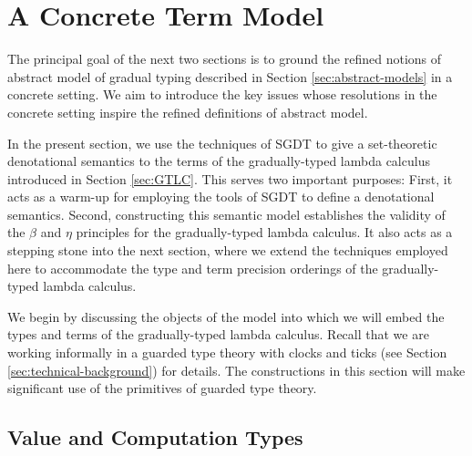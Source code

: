 \section{A Concrete Term Model}\label{sec:concrete-term-model}

The principal goal of the next two sections is to ground the refined notions of
abstract model of gradual typing described in Section \ref{sec:abstract-models}
in a concrete setting. We aim to introduce the key issues whose resolutions in
the concrete setting inspire the refined definitions of abstract model.

In the present section, we use the techniques of SGDT to give a set-theoretic
denotational semantics to the terms of the gradually-typed lambda calculus
introduced in Section \ref{sec:GTLC}. This serves two important purposes: First,
it acts as a warm-up for employing the tools of SGDT to define a denotational
semantics. Second, constructing this semantic model establishes the validity of
the $\beta$ and $\eta$ principles for the gradually-typed lambda calculus. It
also acts as a stepping stone into the next section, where we extend the
techniques employed here to accommodate the type and term precision orderings of
the gradually-typed lambda calculus.
%



We begin by discussing the objects of the model into which we will embed the
types and terms of the gradually-typed lambda calculus. Recall that we are
working informally in a guarded type theory with clocks and ticks (see Section
\ref{sec:technical-background}) for details. The constructions in this section
will make significant use of the primitives of guarded type theory.

\subsection{Value and Computation Types}


